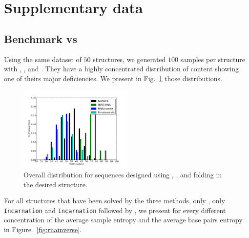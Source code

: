 \section{Supplementary data}
\subsection{Benchmark \ourprog vs \RNAinverse}
Using the same dataset of $50$ structures, we generated $100$ samples
per structure %
with  \RNAinverse, \INFORNA, \NUPACK and \frankenstein. They have a highly concentrated distribution of \GC content showing one of theirs major deficiencies. We present in Fig.~\ref{fig:gcdist} those distributions.

\begin{figure}[ht]
  \begin{center}
    \includegraphics[width=0.5\textwidth]{Figures/histograme_5_gc_distribution_nornaexinv.png}
  \end{center}
  \caption{Overall \GCContent distribution for sequences designed using \RNAinverse, \INFORNA, \NUPACK and \frankenstein folding in the desired structure.}
  \label{fig:gcdist}
\end{figure}

 For all structures that have been solved 
by the three methods, only \RNAinverse, only \texttt{Incarnation} and
\texttt{Incarnation} followed by \RNAinverse, 
we present for every different concentration of \GCContent
the average sample entropy and the average base pairs entropy in Figure.~\ref{fig:rnainverse}.



